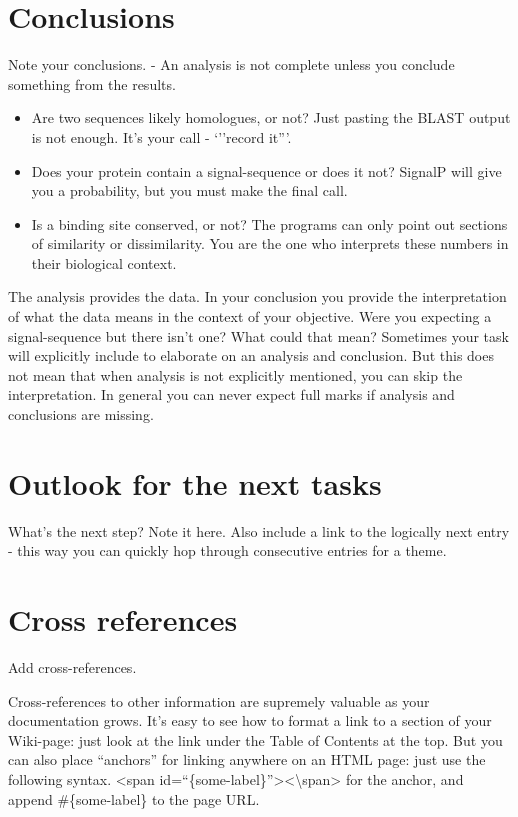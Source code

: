 \documentclass[]{book}
\providecommand{\tightlist}{%
  \setlength{\itemsep}{0pt}\setlength{\parskip}{0pt}}
\begin{document}
\section{Conclusions}\label{conclusions}

Note your conclusions. - An analysis is not complete unless you conclude
something from the results.

\begin{itemize}
\tightlist
\item
  Are two sequences likely homologues, or not? Just pasting the BLAST
  output is not enough. It's your call - `''record it'''.
\item
  Does your protein contain a signal-sequence or does it not? SignalP
  will give you a probability, but you must make the final call.
\item
  Is a binding site conserved, or not? The programs can only point out
  sections of similarity or dissimilarity. You are the one who
  interprets these numbers in their biological context.
\end{itemize}

The analysis provides the data. In your conclusion you provide the
interpretation of what the data means in the context of your objective.
Were you expecting a signal-sequence but there isn't one? What could
that mean? Sometimes your task will explicitly include to elaborate on
an analysis and conclusion. But this does not mean that when analysis is
not explicitly mentioned, you can skip the interpretation. In general
you can never expect full marks if analysis and conclusions are missing.

\section{Outlook for the next tasks}\label{outlook-for-the-next-tasks}

What's the next step? Note it here. Also include a link to the logically
next entry - this way you can quickly hop through consecutive entries
for a theme.

\section{Cross references}\label{cross-references}

Add cross-references.

Cross-references to other information are supremely valuable as your
documentation grows. It's easy to see how to format a link to a section
of your Wiki-page: just look at the link under the Table of Contents at
the top. But you can also place ``anchors'' for linking anywhere on an
HTML page: just use the following syntax. \textless{}span
id=``\{some-label\}''\textgreater{}\textless{}\textbackslash{}span\textgreater{}
for the anchor, and append \#\{some-label\} to the page URL.
\end{document}
